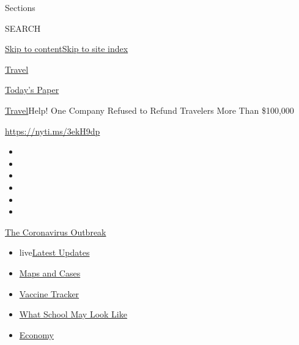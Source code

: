 Sections

SEARCH

\protect\hyperlink{site-content}{Skip to
content}\protect\hyperlink{site-index}{Skip to site index}

\href{https://www.nytimes.com/section/travel}{Travel}

\href{https://myaccount.nytimes.com/auth/login?response_type=cookie\&client_id=vi}{}

\href{https://www.nytimes.com/section/todayspaper}{Today's Paper}

\href{/section/travel}{Travel}\textbar{}Help! One Company Refused to
Refund Travelers More Than \$100,000

\url{https://nyti.ms/3ekH9dp}

\begin{itemize}
\item
\item
\item
\item
\item
\item
\end{itemize}

\href{https://www.nytimes.com/news-event/coronavirus?action=click\&pgtype=Article\&state=default\&region=TOP_BANNER\&context=storylines_menu}{The
Coronavirus Outbreak}

\begin{itemize}
\tightlist
\item
  live\href{https://www.nytimes.com/2020/08/01/world/coronavirus-covid-19.html?action=click\&pgtype=Article\&state=default\&region=TOP_BANNER\&context=storylines_menu}{Latest
  Updates}
\item
  \href{https://www.nytimes.com/interactive/2020/us/coronavirus-us-cases.html?action=click\&pgtype=Article\&state=default\&region=TOP_BANNER\&context=storylines_menu}{Maps
  and Cases}
\item
  \href{https://www.nytimes.com/interactive/2020/science/coronavirus-vaccine-tracker.html?action=click\&pgtype=Article\&state=default\&region=TOP_BANNER\&context=storylines_menu}{Vaccine
  Tracker}
\item
  \href{https://www.nytimes.com/interactive/2020/07/29/us/schools-reopening-coronavirus.html?action=click\&pgtype=Article\&state=default\&region=TOP_BANNER\&context=storylines_menu}{What
  School May Look Like}
\item
  \href{https://www.nytimes.com/live/2020/07/31/business/stock-market-today-coronavirus?action=click\&pgtype=Article\&state=default\&region=TOP_BANNER\&context=storylines_menu}{Economy}
\end{itemize}

